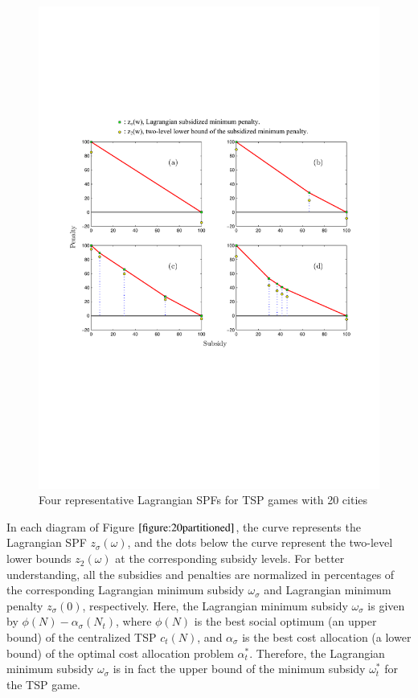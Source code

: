 \documentclass[authoryear,review,12pt]{elsarticle}
\begin{document}
\begin{figure}[H]
\centering
\includegraphics[width=1\textwidth]{1.pdf}
\centering
\caption{\label{figure:20partitioned}Four representative Lagrangian SPFs for TSP games with 20 cities}
\end{figure}


In each diagram of Figure $\ref{figure:20partitioned}$, the curve represents the Lagrangian SPF $z_{\sigma}(\omega)$, and the dots below the curve represent the two-level lower bounds $z_{2}(\omega)$ at the corresponding subsidy levels.
For better understanding, all the subsidies and penalties are normalized in percentages of the corresponding Lagrangian minimum subsidy $\omega_{\sigma}$ and Lagrangian minimum penalty $z_{\sigma}(0)$, respectively.
Here, the Lagrangian minimum subsidy $\omega_{\sigma}$ is given by $\phi(N) - \alpha_{\sigma}(N_t)$, where $\phi(N)$ is the best social optimum (an upper bound) of the centralized TSP $c_t(N)$, and $\alpha_{\sigma}$ is the best cost allocation (a lower bound) of the optimal cost allocation problem $\alpha_t^*$.
Therefore, the Lagrangian minimum subsidy $\omega_{\sigma}$ is in fact the upper bound of the minimum subsidy $\omega_t^*$ for the TSP game.
\end{document}
